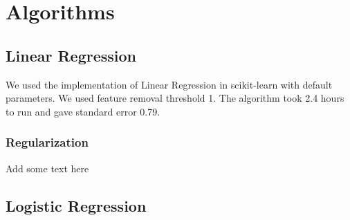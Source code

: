 \documentclass[journal]{IEEEtran}
\begin{document}
\section{Algorithms}

\subsection{Linear Regression}
We used the implementation of Linear Regression in scikit-learn with default
parameters. We used feature removal threshold 1. The algorithm took 2.4 hours
to run and gave standard error 0.79.

\subsubsection{Regularization}
Add some text here

\subsection{Logistic Regression}
\end{document}
